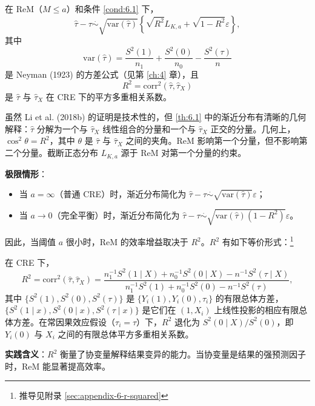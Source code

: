 \begin{Theorem}\label{th:6.1}
在 ReM（$M \leq a$）和条件 \cref{cond:6.1} 下，
\[
\hat{\tau} - \tau \stackrel{.}{\sim} \sqrt{\text{var}(\hat{\tau})} \left\{ \sqrt{R^2} L_{K,a} + \sqrt{1-R^2} \varepsilon \right\},
\]
其中
\[
\text{var}(\hat{\tau}) = \frac{S^2(1)}{n_1} + \frac{S^2(0)}{n_0} - \frac{S^2(\tau)}{n}
\]
是 Neyman (1923) 的方差公式（见第 \ref{ch:4} 章），且
\[
R^2 = \text{corr}^2(\hat{\tau}, \hat{\tau}_X)
\]
是 $\hat{\tau}$ 与 $\hat{\tau}_X$ 在 CRE 下的平方多重相关系数。
\end{Theorem}

虽然 Li et al. (2018b) 的证明是技术性的，但 \cref{th:6.1} 中的渐近分布有清晰的几何解释：$\hat{\tau}$ 分解为一个与 $\hat{\tau}_X$ 线性组合的分量和一个与 $\hat{\tau}_X$ 正交的分量。几何上，$\cos^2 \theta = R^2$，其中 $\theta$ 是 $\hat{\tau}$ 与 $\hat{\tau}_X$ 之间的夹角。ReM 影响第一个分量，但不影响第二个分量。截断正态分布 $L_{K,a}$ 源于 ReM 对第一个分量的约束。

\textbf{极限情形}：
\begin{itemize}
  \item 当 $a = \infty$（普通 CRE）时，渐近分布简化为 $\hat{\tau} - \tau \stackrel{.}{\sim} \sqrt{\text{var}(\hat{\tau})} \varepsilon$；
  \item 当 $a \to 0$（完全平衡）时，渐近分布简化为 $\hat{\tau} - \tau \stackrel{.}{\sim} \sqrt{\text{var}(\hat{\tau})(1-R^2)} \varepsilon$。
\end{itemize}

因此，当阈值 $a$ 很小时，ReM 的效率增益取决于 $R^2$。$R^2$ 有如下等价形式：\footnote{推导见附录 \cref{sec:appendix-6-r-squared}}

\begin{Proposition}[命题 6.1 — $R^2$ 的等价形式]\label{prop:6.1}
在 CRE 下，
\[
R^2 = \text{corr}^2(\hat{\tau}, \hat{\tau}_X) = \frac{n_1^{-1}S^2(1 \mid X) + n_0^{-1}S^2(0 \mid X) - n^{-1}S^2(\tau \mid X)}{n_1^{-1}S^2(1) + n_0^{-1}S^2(0) - n^{-1}S^2(\tau)} ,
\]
其中 $\{S^2(1), S^2(0), S^2(\tau)\}$ 是 $\{Y_i(1), Y_i(0), \tau_i\}$ 的有限总体方差，$\{S^2(1 \mid x), S^2(0 \mid x), S^2(\tau \mid x)\}$ 是它们在 $(1, X_i)$ 上线性投影的相应有限总体方差。在常因果效应假设（$\tau_i = \tau$）下，$R^2$ 退化为 $S^2(0 \mid X) / S^2(0)$，即 $Y_i(0)$ 与 $X_i$ 之间的有限总体平方多重相关系数。
\end{Proposition}

\textbf{实践含义}：$R^2$ 衡量了协变量解释结果变异的能力。当协变量是结果的强预测因子时，ReM 能显著提高效率。

